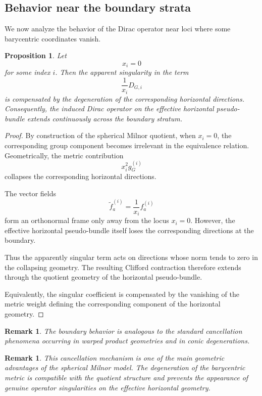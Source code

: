 \documentclass[11pt]{amsart}
\newtheorem{proposition}[theorem]{Proposition}
\newtheorem{remark}[theorem]{Remark}
\begin{document}
\subsection{Behavior near the boundary strata}

We now analyze the behavior of the Dirac operator near loci where some
barycentric coordinates vanish.

\begin{proposition}
Let
\[
x_i=0
\]
for some index \(i\). Then the apparent singularity in the term
\[
\frac1{x_i}D_{G,i}
\]
is compensated by the degeneration of the corresponding horizontal directions.
Consequently, the induced Dirac operator on the effective horizontal
pseudo-bundle extends continuously across the boundary stratum.
\end{proposition}

\begin{proof}
By construction of the spherical Milnor quotient, when \(x_i=0\), the
corresponding group component becomes irrelevant in the equivalence relation.
Geometrically, the metric contribution
\[
x_i^2 g_G^{(i)}
\]
collapses the corresponding horizontal directions.

The vector fields
\[
\widetilde f_a^{(i)}
=
\frac1{x_i}f_a^{(i)}
\]
form an orthonormal frame only away from the locus \(x_i=0\). However, the
effective horizontal pseudo-bundle itself loses the corresponding directions
at the boundary.

Thus the apparently singular term acts on directions whose norm tends to zero
in the collapsing geometry. The resulting Clifford contraction therefore
extends through the quotient geometry of the horizontal pseudo-bundle.

Equivalently, the singular coefficient is compensated by the vanishing of the
metric weight defining the corresponding component of the horizontal geometry.
\end{proof}

\begin{remark}
The boundary behavior is analogous to the standard cancellation phenomena
occurring in warped product geometries and in conic degenerations.
\end{remark}

\begin{remark}
This cancellation mechanism is one of the main geometric advantages of the
spherical Milnor model. The degeneration of the barycentric metric is
compatible with the quotient structure and prevents the appearance of genuine
operator singularities on the effective horizontal geometry.
\end{remark}
\end{document}
